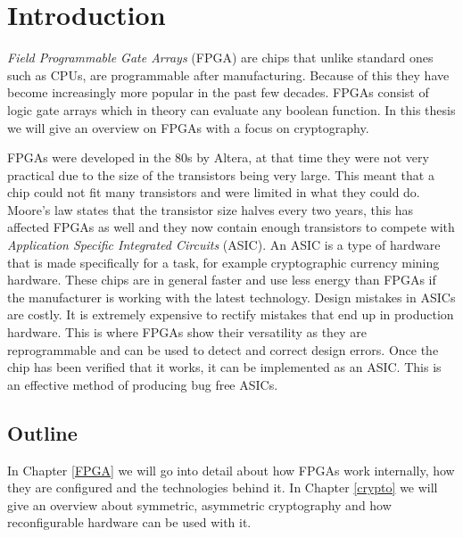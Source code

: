 \chapter{Introduction\label{intro}}

\textit{Field Programmable Gate Arrays} (FPGA) are chips that unlike standard
ones such as CPUs, are programmable after manufacturing. Because of this they
have become increasingly more popular in the past few decades. FPGAs consist of
logic gate arrays which in theory can evaluate any boolean function. In this
thesis we will give an overview on FPGAs with a focus on cryptography.

FPGAs were developed in the 80s by Altera, at that time they were not very
practical due to the size of the transistors being very large. This meant that
a chip could not fit many transistors and were limited in what they could do.
Moore's law states that the transistor size halves every two years, this has
affected FPGAs as well and they now contain enough transistors to compete with
\textit{Application Specific Integrated Circuits} (ASIC). An ASIC is a type of
hardware that is made specifically for a task, for example cryptographic
currency mining hardware. These chips are in general faster and use less energy
than FPGAs if the manufacturer is working with the latest technology. Design
mistakes in ASICs are
costly. It is extremely expensive to rectify mistakes that end up in production
hardware. This is where FPGAs show their versatility as they are
reprogrammable and can be used to detect and correct design errors. Once the
chip has been verified that it works, it can be implemented as an ASIC. This
is an effective method of producing bug free ASICs.

\section{Outline\label{outline}}
In Chapter \ref{FPGA} we will go into detail about how FPGAs work internally,
how they are configured and the technologies behind it. In Chapter \ref{crypto}
we will give an overview about symmetric, asymmetric cryptography and how
reconfigurable hardware can be used with it.
